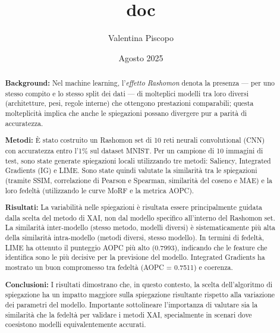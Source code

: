 \documentclass[12pt,a4paper,oneside]{report}
\title{doc}
\author{Valentina Piscopo}
\date{Agosto 2025}
\numberwithin{figure}{chapter}
\numberwithin{table}{chapter}
\begin{document}
\maketitle

\begin{abstract}
      \noindent
      \textbf{Background:} Nel machine learning, l’\emph{effetto Rashomon} denota la presenza — per uno stesso compito e lo stesso split dei dati — di molteplici modelli tra loro diversi (architetture, pesi, regole interne) che ottengono prestazioni comparabili; questa molteplicità implica che anche le spiegazioni possano divergere pur a parità di accuratezza.
      \vspace{0.5em}

      \noindent
      \textbf{Metodi:} È stato costruito un Rashomon set di 10 reti neurali convolutional (CNN) con accuratezza entro l'1\% sul dataset MNIST. Per un campione di 10 immagini di test, sono state generate spiegazioni locali utilizzando tre metodi: Saliency, Integrated Gradients (IG) e LIME. Sono state quindi valutate la similarità tra le spiegazioni (tramite SSIM, correlazione di Pearson e Spearman, similarità del coseno e MAE) e la loro fedeltà (utilizzando le curve MoRF e la metrica AOPC).

      \vspace{0.5em}

      \noindent
      \textbf{Risultati:} La variabilità nelle spiegazioni è risultata essere principalmente guidata dalla scelta del metodo di XAI, non dal modello specifico all'interno del Rashomon set. La similarità inter-modello (stesso metodo, modelli diversi) è sistematicamente più alta della similarità intra-modello (metodi diversi, stesso modello). In termini di fedeltà, LIME ha ottenuto il punteggio AOPC più alto (0.7993), indicando che le feature che identifica sono le più decisive per la previsione del modello. Integrated Gradients ha mostrato un buon compromesso tra fedeltà (AOPC = 0.7511) e coerenza.

      \vspace{0.5em}

      \noindent
      \textbf{Conclusioni:} I risultati dimostrano che, in questo contesto, la scelta dell'algoritmo di spiegazione ha un impatto maggiore sulla spiegazione risultante rispetto alla variazione dei parametri del modello. Importante sottolineare l'importanza di valutare sia la similarità che la fedeltà per validare i metodi XAI, specialmente in scenari dove coesistono modelli equivalentemente accurati.
\end{abstract}
\newpage
\end{document}
